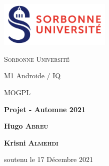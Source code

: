 \begin{titlepage}
  \centering

  \includegraphics[width=0.4\textwidth]{img/logo_sorbonne.png}

  \vspace{3cm}

  {\scshape\LARGE Sorbonne Université \par M1 Androide / IQ\par}
  \vspace{1cm}
  {\scshape\Large MOGPL\par}
  \vspace{3cm}
  {\huge\bfseries Projet - Automne 2021\par}
  \vspace{3cm}
  {\Large \textbf{Hugo \textsc{Abreu}}\par}
  {\Large \textbf{Krisni \textsc{Almehdi}}\par}
  \vspace{2cm}

  soutenu le 17 Décembre 2021\par


  \vfill


\end{titlepage}
\newpage